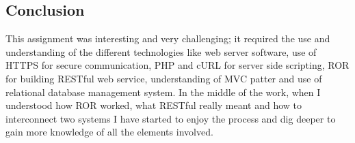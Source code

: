 \documentclass[10pt,a4paper,headinclude=true,twoside]{report}
\begin{document}
\subsection{Conclusion}
This assignment was interesting and very challenging; it required the use and understanding of the different technologies like web server software, use of HTTPS for secure communication, PHP and cURL for server side scripting, ROR for building RESTful web service, understanding of MVC patter and use of relational database management system. In the middle of the work, when I understood how ROR worked, what RESTful really meant and how to interconnect two systems I have started to enjoy the process and dig deeper to gain more knowledge of all the elements involved.  




\end{document}
